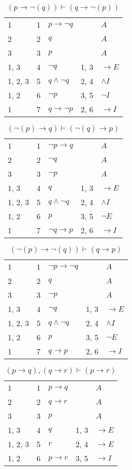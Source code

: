 \documentclass{article}
\begin{document}
\begin{table}[htbp]\caption*{$(p → ¬(q)) ⊢ (q → ¬(p))$}\centering\begin{tabular}{lrlll}
{1} & 1 & $p→ ¬q$ & {} & $A$ \\
{2} & 2 & $q$ & {} & $A$ \\
{3} & 3 & $p$ & {} & $A$ \\
{1, 3} & 4 & $¬q$ & {1, 3} & $→E$ \\
{1, 2, 3} & 5 & $q∧ ¬q$ & {2, 4} & $∧I$ \\
{1, 2} & 6 & $¬p$ & {3, 5} & $¬I$ \\
{1} & 7 & $q→ ¬p$ & {2, 6} & $→I$ \\
\end{tabular}
\end{table}
\begin{table}[htbp]\caption*{$(¬(p) → q) ⊢ (¬(q) → p)$}\centering\begin{tabular}{lrlll}
{1} & 1 & $¬p→q$ & {} & $A$ \\
{2} & 2 & $¬q$ & {} & $A$ \\
{3} & 3 & $¬p$ & {} & $A$ \\
{1, 3} & 4 & $q$ & {1, 3} & $→E$ \\
{1, 2, 3} & 5 & $q∧ ¬q$ & {2, 4} & $∧I$ \\
{1, 2} & 6 & $p$ & {3, 5} & $¬E$ \\
{1} & 7 & $¬q→p$ & {2, 6} & $→I$ \\
\end{tabular}
\end{table}
\begin{table}[htbp]\caption*{$(¬(p) → ¬(q)) ⊢ (q → p)$}\centering\begin{tabular}{lrlll}
{1} & 1 & $¬p→ ¬q$ & {} & $A$ \\
{2} & 2 & $q$ & {} & $A$ \\
{3} & 3 & $¬p$ & {} & $A$ \\
{1, 3} & 4 & $¬q$ & {1, 3} & $→E$ \\
{1, 2, 3} & 5 & $q∧ ¬q$ & {2, 4} & $∧I$ \\
{1, 2} & 6 & $p$ & {3, 5} & $¬E$ \\
{1} & 7 & $q→p$ & {2, 6} & $→I$ \\
\end{tabular}
\end{table}
\begin{table}[htbp]\caption*{$(p → q),(q → r) ⊢ (p → r)$}\centering\begin{tabular}{lrlll}
{1} & 1 & $p→q$ & {} & $A$ \\
{2} & 2 & $q→r$ & {} & $A$ \\
{3} & 3 & $p$ & {} & $A$ \\
{1, 3} & 4 & $q$ & {1, 3} & $→E$ \\
{1, 2, 3} & 5 & $r$ & {2, 4} & $→E$ \\
{1, 2} & 6 & $p→r$ & {3, 5} & $→I$ \\
\end{tabular}
\end{table}
\end{document}
